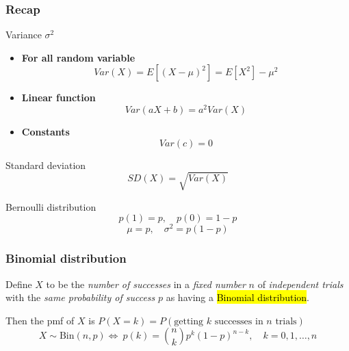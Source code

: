 \documentclass[slidestop,compress,mathserif]{beamer}
\begin{document}
\begin{frame}\frametitle{Recap}

Variance $\sigma^2$
\begin{itemize}
\item \textbf{For all random variable}
\[
Var(X) = E[(X - \mu)^2] = E[X^2] - \mu^2
\]
\vspace{2mm}
\item \textbf{Linear function}
\[Var(aX+b) = a^2 Var(X)\]
\item \textbf{Constants}
\[Var(c) = 0\]
\end{itemize}

Standard deviation
\[SD(X) = \sqrt{Var(X)}\]

Bernoulli distribution
\[p(1) = p, \quad p(0) = 1-p\]
\[\mu  = p, \quad \sigma^2 = p(1-p)\]

\end{frame}




\begin{frame}\frametitle{Binomial distribution}
\begin{defn}
Define $X$ to be the \emph{number of successes} in a \emph{fixed number} $n$
of \emph{independent trials} with the \emph{same probability of success} $p$ as having a \hl{Binomial distribution}.


Then the pmf of $X$ is $P(X = k) = P(\text{getting } k \text{ successes in } n \text{ trials})$
 \vspace{-0.3cm}
\[ X \sim \text{Bin}(n,p) \Longleftrightarrow \ p(k) = {n \choose k} p^k(1-p)^{n-k}, \quad k = 0, 1, \ldots, n\]

\end{defn}




\end{frame}
\end{document}
